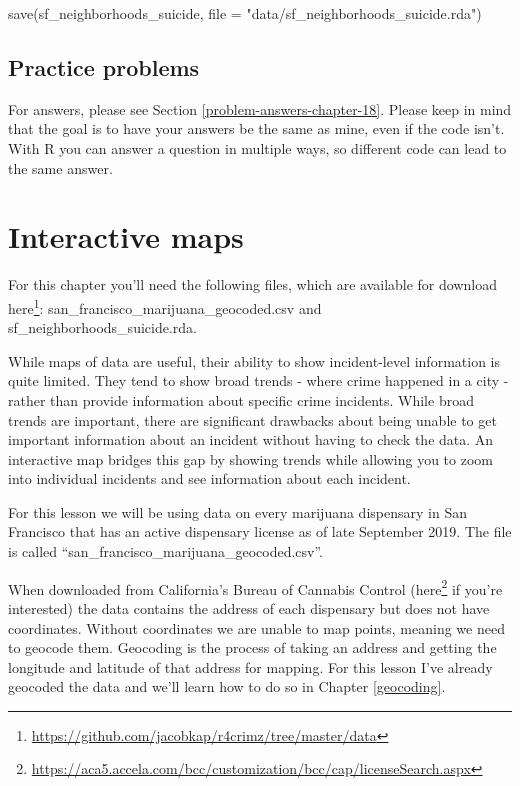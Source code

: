 \documentclass[
]{krantz}
\makeatletter
\newenvironment{Shaded}{\begin{snugshade}}{\end{snugshade}}
\newcommand{\AttributeTok}[1]{\textcolor[rgb]{0.61,0.61,0.61}{#1}}
\newcommand{\FunctionTok}[1]{\textcolor[rgb]{0,0,0}{#1}}
\newcommand{\NormalTok}[1]{#1}
\newcommand{\StringTok}[1]{\textcolor[rgb]{0.5,0.5,0.5}{#1}}
\renewcommand{\href}[2]{#2\footnote{\url{#1}}}
\newenvironment{kframe}{%
\medskip{}
\setlength{\fboxsep}{.8em}
 \def\at@end@of@kframe{}%
 \ifinner\ifhmode%
  \def\at@end@of@kframe{\end{minipage}}%
  \begin{minipage}{\columnwidth}%
 \fi\fi%
 \def\FrameCommand##1{\hskip\@totalleftmargin \hskip-\fboxsep
 \colorbox{shadecolor}{##1}\hskip-\fboxsep
     \hskip-\linewidth \hskip-\@totalleftmargin \hskip\columnwidth}%
 \MakeFramed {\advance\hsize-\width
   \@totalleftmargin\z@ \linewidth\hsize
   \@setminipage}}%
 {\par\unskip\endMakeFramed%
 \at@end@of@kframe}
\renewenvironment{Shaded}{\begin{kframe}}{\end{kframe}}
\makeatother
\begin{document}
\begin{Shaded}
\begin{Highlighting}[]
\FunctionTok{save}\NormalTok{(sf\_neighborhoods\_suicide, }\AttributeTok{file =} \StringTok{"data/sf\_neighborhoods\_suicide.rda"}\NormalTok{)}
\end{Highlighting}
\end{Shaded}

\hypertarget{practice-problems-11}{%
\section{Practice problems}\label{practice-problems-11}}

For answers, please see Section \ref{problem-answers-chapter-18}. Please keep in mind that the goal is to have your answers be the same as mine, even if the code isn't. With R you can answer a question in multiple ways, so different code can lead to the same answer.

\hypertarget{interactive-maps}{%
\chapter{Interactive maps}\label{interactive-maps}}

For this chapter you'll need the following files, which are available for download \href{https://github.com/jacobkap/r4crimz/tree/master/data}{here}: san\_francisco\_marijuana\_geocoded.csv and sf\_neighborhoods\_suicide.rda.

While maps of data are useful, their ability to show incident-level information is quite limited. They tend to show broad trends - where crime happened in a city - rather than provide information about specific crime incidents. While broad trends are important, there are significant drawbacks about being unable to get important information about an incident without having to check the data. An interactive map bridges this gap by showing trends while allowing you to zoom into individual incidents and see information about each incident.

For this lesson we will be using data on every marijuana dispensary in San Francisco that has an active dispensary license as of late September 2019. The file is called ``san\_francisco\_marijuana\_geocoded.csv''.

When downloaded from California's Bureau of Cannabis Control (\href{https://aca5.accela.com/bcc/customization/bcc/cap/licenseSearch.aspx}{here} if you're interested) the data contains the address of each dispensary but does not have coordinates. Without coordinates we are unable to map points, meaning we need to
geocode them. Geocoding is the process of taking an address and getting the longitude and latitude of that address for mapping. For this lesson I've already geocoded the data and we'll learn how to do so in Chapter \ref{geocoding}.
\end{document}
